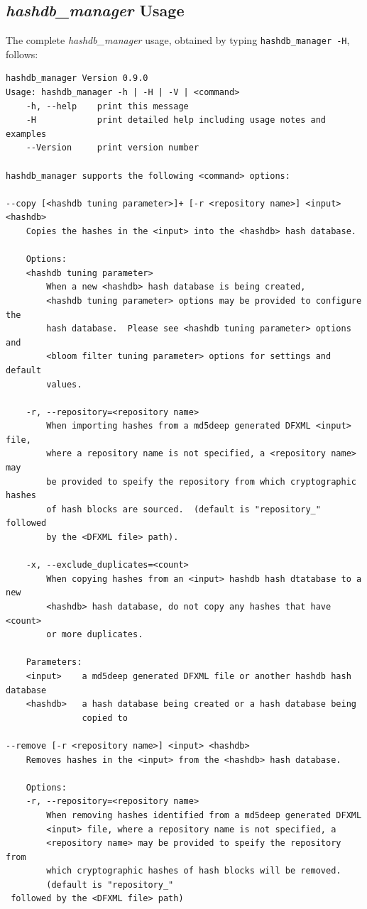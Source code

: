 \documentclass[11pt,twoside]{article}
\newcommand \hdbm {\textit{hashdb\_manager}\xspace}
\begin{document}
\subsection{\hdbm Usage\label{hdbm-usage}}
The complete \hdbm usage,
obtained by typing \texttt{hashdb\_manager -H}, follows:
\begin{small}
\begin{verbatim}
hashdb_manager Version 0.9.0
Usage: hashdb_manager -h | -H | -V | <command>
    -h, --help    print this message
    -H            print detailed help including usage notes and examples
    --Version     print version number

hashdb_manager supports the following <command> options:

--copy [<hashdb tuning parameter>]+ [-r <repository name>] <input> <hashdb>
    Copies the hashes in the <input> into the <hashdb> hash database.

    Options:
    <hashdb tuning parameter>
        When a new <hashdb> hash database is being created,
        <hashdb tuning parameter> options may be provided to configure the
        hash database.  Please see <hashdb tuning parameter> options and
        <bloom filter tuning parameter> options for settings and default
        values.

    -r, --repository=<repository name>
        When importing hashes from a md5deep generated DFXML <input> file,
        where a repository name is not specified, a <repository name> may
        be provided to speify the repository from which cryptographic hashes
        of hash blocks are sourced.  (default is "repository_" followed
        by the <DFXML file> path).

    -x, --exclude_duplicates=<count>
        When copying hashes from an <input> hashdb hash dtatabase to a new
        <hashdb> hash database, do not copy any hashes that have <count>
        or more duplicates.

    Parameters:
    <input>    a md5deep generated DFXML file or another hashdb hash database
    <hashdb>   a hash database being created or a hash database being
               copied to

--remove [-r <repository name>] <input> <hashdb>
    Removes hashes in the <input> from the <hashdb> hash database.

    Options:
    -r, --repository=<repository name>
        When removing hashes identified from a md5deep generated DFXML
        <input> file, where a repository name is not specified, a
        <repository name> may be provided to speify the repository from
        which cryptographic hashes of hash blocks will be removed.
        (default is "repository_"
 followed by the <DFXML file> path)


\end{verbatim}
\end{small}
\end{document}
